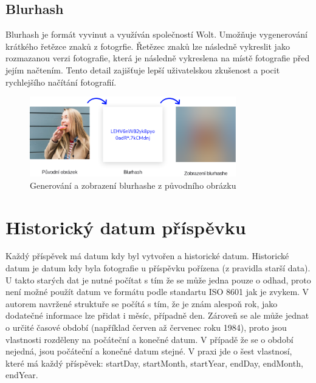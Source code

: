 \documentclass[12pt, a4paper,
 twoside,        %
 openright
]{report}
\begin{document}
\subsection{Blurhash}\label{subsection:blurhash}
Blurhash je formát vyvinut a využíván společností Wolt. Umožňuje vygenerování krátkého řetězce znaků z fotogrfie.
Řetězec znaků lze následně vykreslit jako rozmazanou verzi fotografie, která je následně vykreslena na místě fotografie před jejím načtením.
Tento detail zajišťuje lepší uživatelskou zkušenost a pocit rychlejšího načítání fotografií. \cite{blurhash}\cite{blurhashWoltBlog}

\begin{figure}[h]
	\centering
	\includegraphics[width=0.8\textwidth]{images/blurhash.png}
	\caption{Generování a zobrazení blurhashe z původního obrázku}
\end{figure}
	
\section{Historický datum příspěvku}\label{section:historical_date}
Každý příspěvek má datum kdy byl vytvořen a historické datum. Historické datum je datum kdy byla fotografie u příspěvku pořízena (z pravidla starší data). U takto starých dat je nutné počítat s tím že se může jedna pouze o odhad, proto není možné použít datum ve formátu podle standartu ISO 8601 jak je zvykem. V autorem navržené struktuře se počítá s tím, že je znám alespoň rok, jako dodatečné informace lze přidat i měsíc, případně den. Zároveň se ale může jednat o určité časové období (například červen až červenec roku 1984), proto jsou vlastnosti rozděleny na počáteční a konečné datum. V případě že se o období nejedná, jsou počáteční a konečné datum stejné. V praxi jde o šest vlastnosí, které má každý příspěvek: startDay, startMonth, startYear, endDay, endMonth, endYear.
\end{document}
